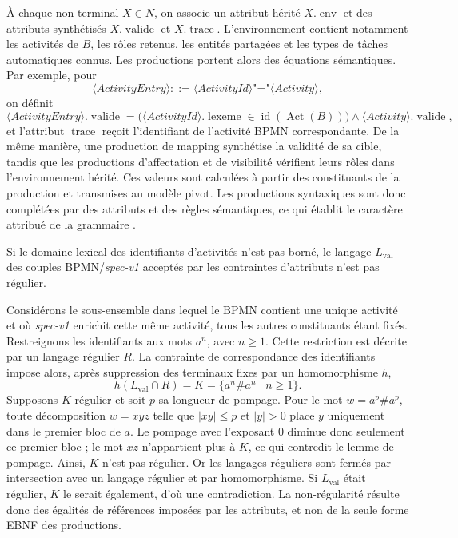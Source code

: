 \begin{preuve}
À chaque non-terminal $X\in N$, on associe un attribut hérité
$X.\operatorname{env}$ et des attributs synthétisés
$X.\operatorname{valide}$ et $X.\operatorname{trace}$. L'environnement contient
notamment les activités de $B$, les rôles retenus, les entités partagées et les
types de tâches automatiques connus. Les productions portent alors des équations
sémantiques. Par exemple, pour
\[
\langle ActivityEntry\rangle
::=\langle ActivityId\rangle\texttt{"="}\langle Activity\rangle,
\]
on définit
\[
\langle ActivityEntry\rangle.\operatorname{valide}
=\bigl(\langle ActivityId\rangle.\operatorname{lexeme}
  \in\operatorname{id}(\operatorname{Act}(B))\bigr)
 \land\langle Activity\rangle.\operatorname{valide},
\]
et l'attribut $\operatorname{trace}$ reçoit l'identifiant de l'activité BPMN
correspondante. De la même manière, une production de mapping synthétise la
validité de sa cible, tandis que les productions d'affectation et de visibilité
vérifient leurs rôles dans l'environnement hérité. Ces valeurs sont calculées à
partir des constituants de la production et transmises au modèle pivot. Les
productions syntaxiques sont donc complétées par des attributs et des règles
sémantiques, ce qui établit le caractère attribué de la grammaire
\cite{klint2005toward,badouel2015active}.
\end{preuve}

\begin{proposition}
Si le domaine lexical des identifiants d'activités n'est pas borné, le langage
$L_{\mathrm{val}}$ des couples BPMN/\textit{spec-v1} acceptés par les contraintes
d'attributs n'est pas régulier.
\end{proposition}

\begin{preuve}
Considérons le sous-ensemble dans lequel le BPMN contient une unique activité et
où \textit{spec-v1} enrichit cette même activité, tous les autres constituants
étant fixés. Restreignons les identifiants aux mots $a^n$, avec $n\geq1$. Cette
restriction est décrite par un langage régulier $R$. La contrainte de
correspondance des identifiants impose alors, après suppression des terminaux
fixes par un homomorphisme $h$,
\[
h(L_{\mathrm{val}}\cap R)
=K=\{a^n\texttt{\#}a^n\mid n\geq1\}.
\]
Supposons $K$ régulier et soit $p$ sa longueur de pompage. Pour le mot
$w=a^p\texttt{\#}a^p$, toute décomposition $w=xyz$ telle que
$|xy|\leq p$ et $|y|>0$ place $y$ uniquement dans le premier bloc de $a$.
Le pompage avec l'exposant $0$ diminue donc seulement ce premier bloc ; le mot
$xz$ n'appartient plus à $K$, ce qui contredit le lemme de pompage. Ainsi, $K$
n'est pas régulier. Or les langages réguliers sont fermés par intersection avec
un langage régulier et par homomorphisme. Si $L_{\mathrm{val}}$ était régulier,
$K$ le serait également, d'où une contradiction. La non-régularité résulte donc
des égalités de références imposées par les attributs, et non de la seule forme
EBNF des productions.
\end{preuve}

